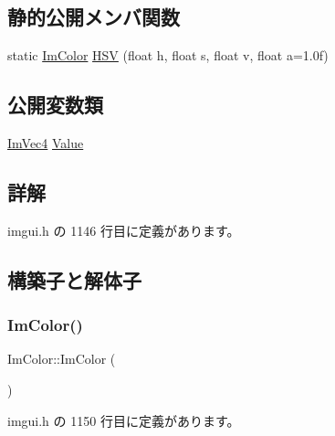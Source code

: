\subsection*{静的公開メンバ関数}
\begin{DoxyCompactItemize}
\item 
static \mbox{\hyperlink{struct_im_color}{Im\+Color}} \mbox{\hyperlink{struct_im_color_ac8cb52119648523038818a613becf010}{H\+SV}} (float h, float s, float v, float a=1.\+0f)
\end{DoxyCompactItemize}
\subsection*{公開変数類}
\begin{DoxyCompactItemize}
\item 
\mbox{\hyperlink{struct_im_vec4}{Im\+Vec4}} \mbox{\hyperlink{struct_im_color_a4cf43bd58e30decaa0248f839fc85e95}{Value}}
\end{DoxyCompactItemize}


\subsection{詳解}


 imgui.\+h の 1146 行目に定義があります。



\subsection{構築子と解体子}
\mbox{\label{struct_im_color_a95206b688dcc03f725790538c74f4526}} 
\subsubsection{\texorpdfstring{Im\+Color()}{ImColor()}\hspace{0.1cm}{\footnotesize\ttfamily [1/5]}}
{\footnotesize\ttfamily Im\+Color\+::\+Im\+Color (\begin{DoxyParamCaption}{ }\end{DoxyParamCaption})\hspace{0.3cm}{\ttfamily [inline]}}



 imgui.\+h の 1150 行目に定義があります。

\mbox{\label{struct_im_color_ab4ba02f8290d5dadc1ebc57b2c8a9cbe}} 
